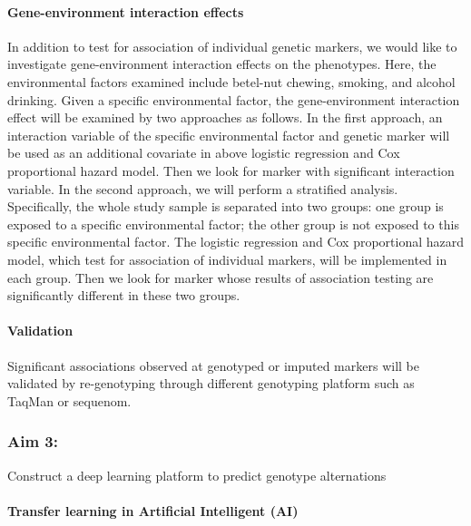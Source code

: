\documentclass[12pt, a4paper]{article}
\begin{document}
\paragraph{Gene-environment interaction effects}
In addition to test for association of individual genetic markers, we would like to investigate gene-environment interaction effects on the phenotypes. Here, the environmental factors examined include betel-nut chewing, smoking, and alcohol drinking. Given a specific environmental factor, the gene-environment interaction effect will be examined by two approaches as follows. 
In the first approach, an interaction variable of the specific environmental factor and genetic marker will be used as an additional covariate in above logistic regression and Cox proportional hazard model. Then we look for marker with significant interaction variable. 
In the second approach, we will perform a stratified analysis. Specifically, the whole study sample is separated into two groups: one group is exposed to a specific environmental factor; the other group is not exposed to this specific environmental factor. The logistic regression and Cox proportional hazard model, which test for association of individual markers, will be implemented in each group. Then we look for marker whose results of association testing are significantly different in these two groups. 

\paragraph{Validation}
Significant associations observed at genotyped or imputed markers will be validated by re-genotyping through different genotyping platform such as TaqMan or sequenom. 




\clearpage


\subsubsection*{Aim 3:} Construct a deep learning platform to predict genotype alternations \\[0.5cm]

\paragraph{Transfer learning in Artificial Intelligent (AI)}
\end{document}
